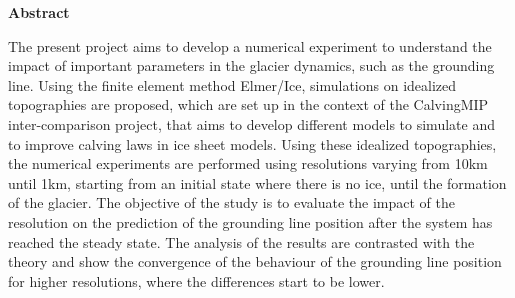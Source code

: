 \begin{center}
	\textbf{\Large{Abstract}}
\end{center}

\vspace{0.5cm}

\justifying

The present project aims to develop a numerical experiment to understand the impact of important parameters in the glacier dynamics, such as the grounding line. Using the finite element method Elmer/Ice, simulations on idealized topographies are proposed, which are set up in the context of the CalvingMIP inter-comparison project, that aims to develop different models to simulate and to improve calving laws in ice sheet models. Using these idealized topographies, the numerical experiments are performed using resolutions varying from 10km until 1km, starting from an initial state where there is no ice, until the formation of the glacier. The objective of the study is to evaluate the impact of the resolution on the prediction of the grounding line position after the system has reached the steady state. The analysis of the results are contrasted with the theory and show the convergence of the behaviour of the grounding line position for higher resolutions, where the differences start to be lower.

\vspace{3cm}

\clearpage